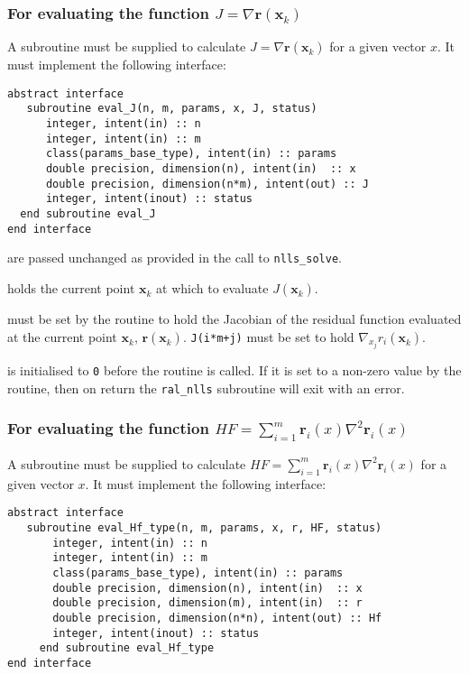 \documentclass{spec}
\newcommand{\vx}{ {\bm x} } %
\newcommand{\vr}{ {\bm r} } %
\newcommand{\iter}[2][k]{ #2_{#1}^{}} %
\begin{document}
\subsubsection{For evaluating the function $J = \nabla \vr(\iter{\vx})$}
A subroutine must be supplied to calculate $J = \nabla \vr(\iter{\vx})$ for a given vector $x$. It
must implement the following interface:

\begin{verbatim}
abstract interface
   subroutine eval_J(n, m, params, x, J, status)
      integer, intent(in) :: n
      integer, intent(in) :: m
      class(params_base_type), intent(in) :: params
      double precision, dimension(n), intent(in)  :: x
      double precision, dimension(n*m), intent(out) :: J
      integer, intent(inout) :: status
  end subroutine eval_J
end interface
\end{verbatim}

\begin{description}
    are passed unchanged as provided in the call to
      {\tt nlls\_solve}.

    holds the current point $\iter{\vx}$ at which to evaluate
      $J(\iter{\vx})$.
  
    must be set by the routine to hold the Jacobian of the residual
      function evaluated at the current point $\iter{\vx}$, $\vr(\iter{\vx})$.
      \texttt{J(i*m+j)} must be set to hold $\nabla_{x_j} r_i(\iter{\vx})$.
       
    is initialised to \texttt{0} before the routine is
      called. If it is set to a non-zero value by the routine, then on return
      the {\tt ral\_nlls} subroutine will exit with an error.
\end{description}

\subsubsection{For evaluating the function $HF = \sum_{i=1}^m \vr_i(x) \nabla^2 \vr_i(x)$}
A subroutine must be supplied to calculate $HF = \sum_{i=1}^m \vr_i(x) \nabla^2 \vr_i(x)$ for a given vector $x$. It must implement the following interface:

\begin{verbatim}
abstract interface
   subroutine eval_Hf_type(n, m, params, x, r, HF, status)
       integer, intent(in) :: n
       integer, intent(in) :: m
       class(params_base_type), intent(in) :: params
       double precision, dimension(n), intent(in)  :: x
       double precision, dimension(m), intent(in)  :: r
       double precision, dimension(n*n), intent(out) :: Hf
       integer, intent(inout) :: status
     end subroutine eval_Hf_type
end interface
\end{verbatim}
\end{document}
